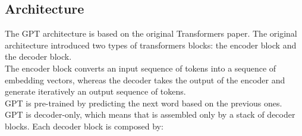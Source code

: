 \subsection{Architecture}
The GPT architecture is based on the original Transformers paper. The original architecture introduced two types of transformers blocks: the encoder block and the decoder block. \\
The encoder block converts an input sequence of tokens into a sequence of embedding vectors, whereas the decoder takes the output of the encoder and generate iteratively an output sequence of tokens. \\
GPT is pre-trained by predicting the next word based on the previous ones. \\
GPT is decoder-only, which means that is assembled only by a stack of decoder blocks. Each decoder block is composed by:
